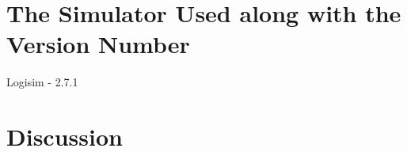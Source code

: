 \documentclass[12pt]{article}
\begin{document}
\vspace{1cm}
\section{The Simulator Used along with the Version Number}
Logisim - 2.7.1


\newpage


\section{\large{Discussion}}
\end{document}
